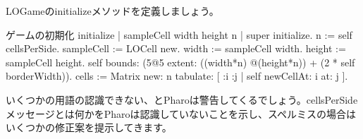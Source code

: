 \documentclass[a4paper,10pt,twoside]{book}
\begin{document}
LOGameのinitializeメソッドを定義しましょう。


\begin{numMethod}[sbegameinitialize]{ゲームの初期化}
initialize
   | sampleCell width height n |
   super initialize.
   n := self cellsPerSide.
   sampleCell := LOCell new.
   width := sampleCell width.
   height := sampleCell height.
   self bounds: (5@5 extent: ((width*n) @(height*n)) + (2 * self borderWidth)).
   cells := Matrix new: n tabulate: [ :i :j | self newCellAt: i at: j ].
\end{numMethod}


いくつかの用語の認識できない、とPharoは警告してくるでしょう。cellsPerSideメッセージとは何かをPharoは認識していないことを示し、スペルミスの場合はいくつかの修正案を提示してきます。
\end{document}
